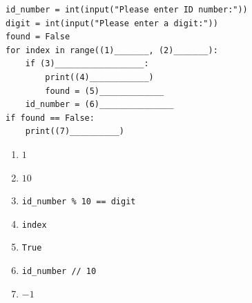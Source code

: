 \documentclass[14pt]{extarticle}
\begin{document}
\begin{enumerate}[label=\textbf{تمرين \arabic*:}, wide=0pt, itemsep=2.2em]
\begin{boxCode}
\begin{english}
\begin{verbatim}
id_number = int(input("Please enter ID number:"))
digit = int(input("Please enter a digit:"))
found = False
for index in range((1)_______, (2)_______):
    if (3)__________________:
        print((4)____________)
        found = (5)_____________
    id_number = (6)_______________
if found == False:
    print((7)__________)
\end{verbatim}
\end{english}
\end{boxCode}

\ifwithsols
\begin{boxSolution}
\begin{enumerate}[label=(\arabic*)]
\item $1$
\item $10$
\item \textenglish{\texttt{id\_number \% 10 == digit}}
\item \textenglish{\texttt{index}}
\item \textenglish{\texttt{True}}
\item \textenglish{\texttt{id\_number // 10}}
\item $-1$
\end{enumerate}
\end{boxSolution}
\fi
\filbreak

\end{enumerate}
\end{document}
